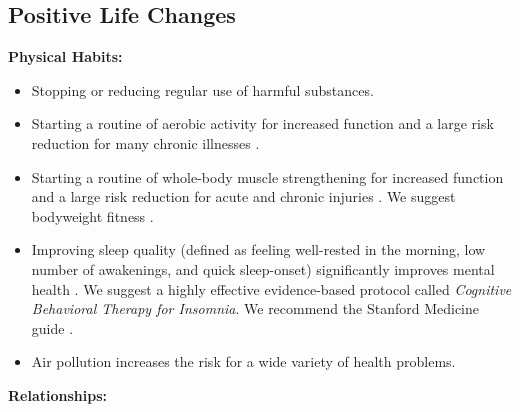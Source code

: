 \documentclass[12pt,letterpaper]{book}
\begin{document}
\subsection{Positive Life Changes}
\label{sec:lifechanges}
\noindent \textbf{Physical Habits:}
\begin{itemize}
    \item Stopping or reducing regular use of harmful substances.
    \item Starting a routine of aerobic activity for increased function and a large risk reduction for many chronic illnesses \cite{liebermanExercised}. 
    \item Starting a routine of whole-body muscle strengthening for increased function and a large risk reduction for acute and chronic injuries \cite{lauersenStrength}. We suggest bodyweight fitness \cite{lowBodyweight}.  
    \item Improving sleep quality (defined as feeling well-rested in the morning, low number of awakenings, and quick sleep-onset) significantly improves mental health \cite{scottSleep}. We suggest a highly effective evidence-based protocol called \textit{Cognitive Behavioral Therapy for Insomnia}. We recommend the Stanford Medicine guide \cite{stanfordSleep}.
    \item Air pollution increases the risk for a wide variety of health problems.
\end{itemize}
\noindent \textbf{Relationships:}
\end{document}

